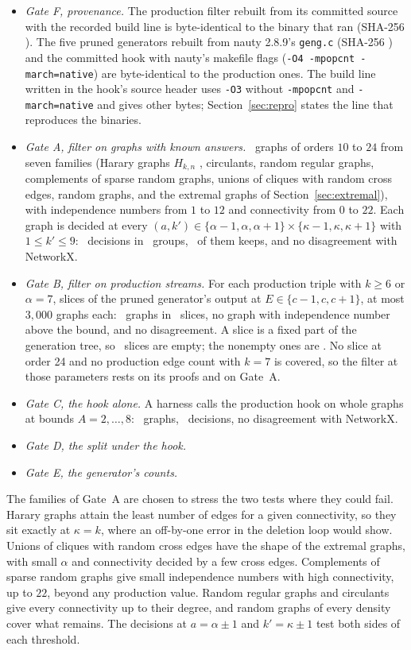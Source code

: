 \documentclass[11pt]{article}
\theoremstyle{definition}
\theoremstyle{remark}
\begin{document}
\begin{itemize}
\item \emph{Gate F, provenance.} The production filter rebuilt from its committed source with the recorded build line
is byte-identical to the binary that ran (SHA-256 \texttt{\shafilter}). The five pruned generators rebuilt from nauty
2.8.9's \texttt{geng.c} (SHA-256 \texttt{\shageng}) and the committed hook with nauty's makefile flags
(\texttt{-O4 -mpopcnt -march=native}) are byte-identical to the production ones. The build line written in the
hook's source header uses \texttt{-O3} without \texttt{-mpopcnt} and \texttt{-march=native} and gives other bytes; Section~\ref{sec:repro} states the line that
reproduces the binaries.
\item \emph{Gate A, filter on graphs with known answers.} \gateAgraphs\ graphs of orders $10$ to $24$ from seven
families (Harary graphs $H_{k,n}$ \cite{Harary}, circulants, random regular graphs, complements of sparse random graphs, unions of
cliques with random cross edges, random graphs, and the extremal graphs of Section~\ref{sec:extremal}), with
independence numbers from $1$ to $12$ and connectivity from $0$ to $22$. Each graph is decided at every
$(a,k')\in\{\alpha-1,\alpha,\alpha+1\}\times\{\kappa-1,\kappa,\kappa+1\}$ with $1\le k'\le9$: \gateAdecisions\
decisions in \gateAgroups\ groups, \gateAkept\ of them keeps, and no disagreement with NetworkX.
\item \emph{Gate B, filter on production streams.} For each production triple with $k\ge6$ or $\alpha=7$, slices of
the pruned generator's output at $E\in\{c-1,c,c+1\}$, at most $3{,}000$ graphs each: \gateBgraphs\ graphs in
\gateBslices\ slices, no graph with independence number above the bound, and no disagreement. A slice is a fixed
part of the generation tree, so \gateBempty\ slices are empty; the nonempty ones are \gateBnonempty. No slice at order
24 and no production edge count with $k=7$ is covered, so the filter at those parameters rests on its proofs and on
Gate~A.
\item \emph{Gate C, the hook alone.} A harness calls the production hook on whole graphs at bounds $A=2,\dots,8$:
\gateCgraphs\ graphs, \gateCdecisions\ decisions, no disagreement with NetworkX.
\item \emph{Gate D, the split under the hook.} \gateDsummary
\item \emph{Gate E, the generator's counts.} \gateEsummary
\end{itemize}

The families of Gate~A are chosen to stress the two tests where they could fail. Harary graphs attain the least number
of edges for a given connectivity, so they sit exactly at $\kappa=k$, where an off-by-one error in the deletion loop
would show. Unions of cliques with random cross edges have the shape of the extremal graphs, with small $\alpha$ and
connectivity decided by a few cross edges. Complements of sparse random graphs give small independence numbers with
high connectivity, up to $22$, beyond any production value. Random regular graphs and circulants give every
connectivity up to their degree, and random graphs of every density cover what remains. The decisions at
$a=\alpha\pm1$ and $k'=\kappa\pm1$ test both sides of each threshold.
\end{document}
